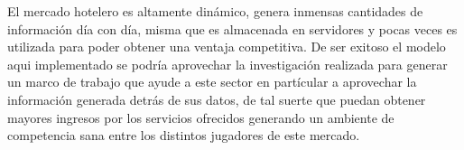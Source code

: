 El mercado hotelero es altamente dinámico, genera inmensas cantidades de información día con día, misma que es almacenada en servidores y pocas veces es utilizada para poder obtener una ventaja competitiva. De ser exitoso el modelo aqui implementado se podría aprovechar la investigación realizada para generar un marco de trabajo que ayude a este sector en partícular a aprovechar la información generada detrás de sus datos, de tal suerte que puedan obtener mayores ingresos por los servicios ofrecidos generando un ambiente de competencia sana entre los distintos jugadores de este mercado.



